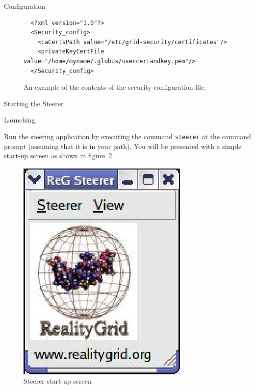 \documentclass[a4paper,twoside]{article}
\begin{document}
\begin{section}{Configuration}
\begin{figure}
\begin{verbatim}
  <?xml version="1.0"?>
  <Security_config>
    <caCertsPath value="/etc/grid-security/certificates"/>
    <privateKeyCertFile value="/home/myname/.globus/usercertandkey.pem"/>
  </Security_config>
\end{verbatim}
\caption{An example of the contents of the security configuration file.}
\label{fig:security_conf}
\end{figure}

\end{section}


\begin{section}{Starting the Steerer}

\begin{subsection}{Launching}

Run the steering application by executing the command \texttt{steerer}
at the command prompt (assuming that it is in your path). You will be
presented with a simple start-up screen as shown in
figure~\ref{fig:startup_screen}.


\begin{figure}
\centerline{\includegraphics{startup_screen.eps}}
\caption{Steerer start-up screen}
\label{fig:startup_screen}
\end{figure}

\end{subsection}


\end{section}
\end{document}
